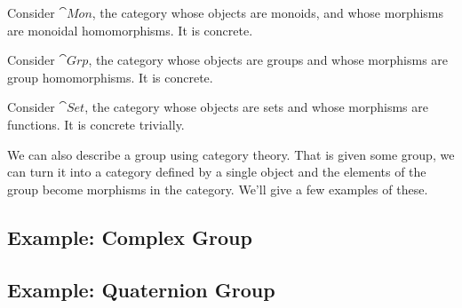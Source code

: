 \begin{ex}\label{ex:Mon}
Consider $\cat{Mon}$, the category whose objects are monoids, and whose
morphisms are monoidal homomorphisms. It is concrete.
\end{ex}
\begin{ex}\label{ex:Grp}
Consider $\cat{Grp}$, the category whose objects are groups and whose
morphisms are group homomorphisms. It is concrete.
\end{ex}
\begin{ex}\label{ex:Set}
Consider $\cat{Set}$, the category whose objects are sets and whose
morphisms are functions. It is concrete trivially.
\end{ex}

We can also describe a group using category theory. That is given
some group, we can turn it into a category defined by a single
object and the elements of the group become morphisms in the
category. We'll give a few examples of these.
\subsection{Example: Complex Group}

\subsection{Example: Quaternion Group}

